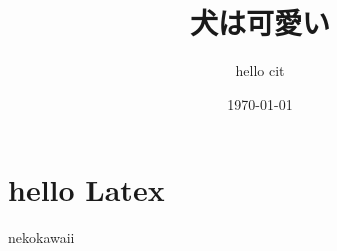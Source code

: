 \documentclass{jsarticle}
\title{犬は可愛い}
\author{hello cit}
\date{\today}
\begin{document}
\maketitle
\section{hello Latex}

nekokawaii
\end{document}
